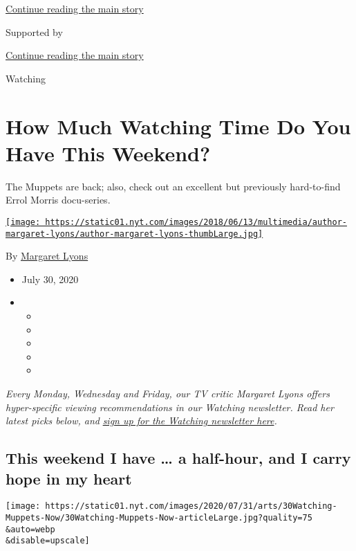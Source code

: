 \protect\hyperlink{after-top}{Continue reading the main story}

Supported by

\protect\hyperlink{after-sponsor}{Continue reading the main story}

Watching

\hypertarget{how-much-watching-time-do-you-have-this-weekend}{%
\section{How Much Watching Time Do You Have This
Weekend?}\label{how-much-watching-time-do-you-have-this-weekend}}

The Muppets are back; also, check out an excellent but previously
hard-to-find Errol Morris docu-series.

\href{https://www.nytimes.com/by/margaret-lyons}{\texttt{[image: https://static01.nyt.com/images/2018/06/13/multimedia/author-margaret-lyons/author-margaret-lyons-thumbLarge.jpg]}}

By \href{https://www.nytimes.com/by/margaret-lyons}{Margaret Lyons}

\begin{itemize}
\item
  July 30, 2020
\item
  \begin{itemize}
  \item
  \item
  \item
  \item
  \item
  \end{itemize}
\end{itemize}

\emph{Every Monday, Wednesday and Friday, our TV critic Margaret Lyons
offers hyper-specific viewing recommendations in our Watching
newsletter. Read her latest picks below, and}
\href{https://www.nytimes.com/newsletters/watching}{\emph{sign up for
the Watching newsletter here}}\emph{.}

\hypertarget{this-weekend-i-have--a-half-hour-and-i-carry-hope-in-my-heart}{%
\subsection{This weekend I have \ldots{} a half-hour, and I carry hope
in my
heart}\label{this-weekend-i-have--a-half-hour-and-i-carry-hope-in-my-heart}}

\texttt{[image: https://static01.nyt.com/images/2020/07/31/arts/30Watching-Muppets-Now/30Watching-Muppets-Now-articleLarge.jpg?quality=75\\\&auto=webp\\\&disable=upscale]}

